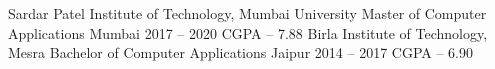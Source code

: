 

\begin{cventries}

  \cventry
    {Sardar Patel Institute of Technology, Mumbai University} %
    {Master of Computer Applications} %
    {Mumbai} %
    {2017 -- 2020} %
    {CGPA -- 7.88
    }
    \vspace{0.9em}
    \cventry
    {Birla Institute of Technology, Mesra} %
    {Bachelor of Computer Applications} %
    {Jaipur} %
    {2014 -- 2017} %
    {CGPA -- 6.90
    }

\end{cventries}
